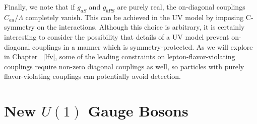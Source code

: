 {Finally, we note that if $g_{aS}$ and $g_{bPS}$ are purely real, the on-diagonal couplings $C_{aa}/\Lambda$ completely vanish. This can be achieved in the UV model by imposing C-symmetry on the interactions. Although this choice is arbitrary, it is certainly interesting to consider the possibility that details of a UV model prevent on-diagonal couplings in a manner which is symmetry-protected. As we will explore in Chapter ~\ref{lfv}, some of the leading constraints on lepton-flavor-violating couplings require non-zero diagonal couplings as well, so particles with purely flavor-violating couplings can potentially avoid detection.

\section{New $U(1)$ Gauge Bosons}\label{sec:U1_bosons}

}
